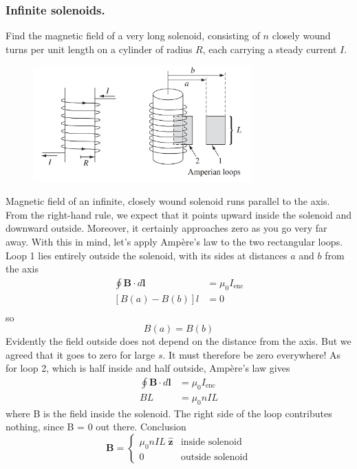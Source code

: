 \documentclass[../../../main.tex]{subfiles}
\begin{document}
\subsubsection*{Inﬁnite solenoids.} Find the magnetic ﬁeld of a very long solenoid, consisting of $n$ closely wound turns per unit length on a cylinder of radius $R$, each carrying a steady current $I$.

\begin{figure}[ht]
    \centering
    \includegraphics[width=0.75\textwidth]{../Rss/Electromagnetism/Magnetostatics/Solenoid.png}
\end{figure}

Magnetic ﬁeld of an inﬁnite, closely wound solenoid runs parallel to the axis. From the right-hand rule, we expect that it points upward inside the solenoid and downward outside. Moreover, it certainly approaches zero as you go very far away. With this in mind, let’s apply Ampère’s law to the two rectangular loops. Loop 1 lies entirely outside the solenoid, with its sides at distances $a$ 
and $b$ from the axis
\begin{align*}
    \oint \mathbf{B}\cdot d\mathbf{l}&=\mu_0I_{\text{enc}}\\
    [B(a)-B(b)]l&=0\\
\end{align*}
so 
\begin{equation*}
    B(a)=B(b)
\end{equation*}
Evidently the ﬁeld outside does not depend on the distance from the axis. But we agreed that it goes to zero for large $s$. It must therefore be zero everywhere! As for loop 2, which is half inside and half outside, Ampère’s law gives
\begin{align*}
    \oint \mathbf{B}\cdot d\mathbf{l}&=\mu_0I_{\text{enc}}\\
    BL&=\mu_0nIL
\end{align*}
where B is the ﬁeld inside the solenoid. The right side of the loop contributes 
nothing, since B = 0 out there. Conclusion
\begin{equation*}
    \mathbf{B}=\begin{cases}
        \mu_0nIL\;\mathbf{\hat{z}}&\text{inside solenoid}\\
        0&\text{outside solenoid}
    \end{cases}
\end{equation*}
\end{document}
